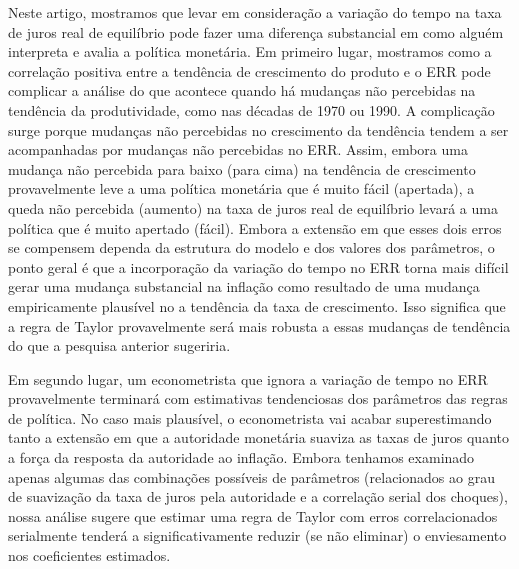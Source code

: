 Neste artigo, mostramos que levar em consideração a variação do tempo na taxa de juros real de equilíbrio pode fazer uma diferença substancial em como alguém interpreta e avalia a política monetária. Em primeiro lugar, mostramos como a correlação positiva entre a tendência de crescimento do produto e o ERR pode complicar a análise do que acontece quando há mudanças não percebidas na tendência da produtividade, como nas décadas de 1970 ou 1990. A complicação surge porque mudanças não percebidas no crescimento da tendência tendem a ser acompanhadas por mudanças não percebidas no ERR. Assim, embora uma mudança não percebida para baixo (para cima) na tendência de crescimento provavelmente leve a uma política monetária que é muito fácil (apertada), a queda não percebida (aumento) na taxa de juros real de equilíbrio levará a uma política que é muito apertado (fácil). Embora a extensão em que esses dois erros se compensem dependa da estrutura do modelo e dos valores dos parâmetros, o ponto geral é que a incorporação da variação do tempo no ERR torna mais difícil gerar uma mudança substancial na inflação como resultado de uma mudança empiricamente plausível no a tendência da taxa de crescimento. Isso significa que a regra de Taylor provavelmente será mais robusta a essas mudanças de tendência do que a pesquisa anterior sugeriria.

Em segundo lugar, um econometrista que ignora a variação de tempo no ERR provavelmente terminará com estimativas tendenciosas dos parâmetros das regras de política. No caso mais plausível, o econometrista vai acabar superestimando tanto a extensão em que a autoridade monetária suaviza as taxas de juros quanto a força da resposta da autoridade ao inflação. Embora tenhamos examinado apenas algumas das combinações possíveis de parâmetros (relacionados ao grau de suavização da taxa de juros pela autoridade e a correlação serial dos choques), nossa análise sugere que estimar uma regra de Taylor com erros correlacionados serialmente tenderá a significativamente reduzir (se não eliminar) o enviesamento nos coeficientes estimados.

